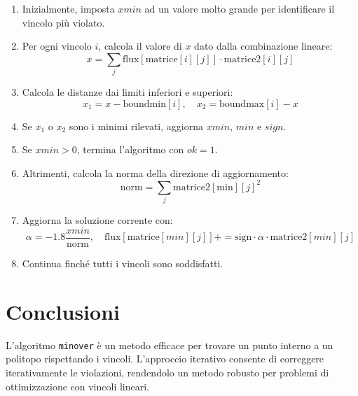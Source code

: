 \documentclass[a4paper,12pt]{article}
\begin{document}
\begin{enumerate}
    \item Inizialmente, imposta $xmin$ ad un valore molto grande per identificare il vincolo pi\`u violato.
    \item Per ogni vincolo $i$, calcola il valore di $x$ dato dalla combinazione lineare:
    \begin{equation}
        x = \sum_{j} \text{flux}[\text{matrice}[i][j]] \cdot \text{matrice2}[i][j]
    \end{equation}
    \item Calcola le distanze dai limiti inferiori e superiori:
    \begin{equation}
        x_1 = x - \text{boundmin}[i], \quad x_2 = \text{boundmax}[i] - x
    \end{equation}
    \item Se $x_1$ o $x_2$ sono i minimi rilevati, aggiorna $xmin$, $min$ e $sign$.
    \item Se $xmin > 0$, termina l'algoritmo con $ok=1$.
    \item Altrimenti, calcola la norma della direzione di aggiornamento:
    \begin{equation}
        \text{norm} = \sum_{j} \text{matrice2}[\text{min}][j]^2
    \end{equation}
    \item Aggiorna la soluzione corrente con:
    \begin{equation}
        \alpha = -1.8 \frac{xmin}{\text{norm}}, \quad \text{flux}[\text{matrice}[min][j]] += \text{sign} \cdot \alpha \cdot \text{matrice2}[min][j]
    \end{equation}
    \item Continua finch\'e tutti i vincoli sono soddisfatti.
\end{enumerate}

\section{Conclusioni}
L'algoritmo \texttt{minover} \`e un metodo efficace per trovare un punto interno a un politopo rispettando i vincoli. L'approccio iterativo consente di correggere iterativamente le violazioni, rendendolo un metodo robusto per problemi di ottimizzazione con vincoli lineari.
\end{document}
